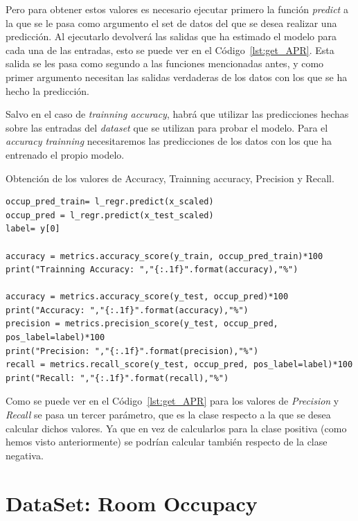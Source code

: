 \documentclass[a4paper, 12pt]{book}
\begin{document}
Pero para obtener estos valores es necesario ejecutar primero la función \textit{predict} a la que se le pasa como argumento el set de datos del que se desea realizar una predicción. Al ejecutarlo devolverá las salidas que ha estimado el modelo para cada una de las entradas, esto se puede ver en el Código~\ref{lst:get_APR}. Esta salida se les pasa como segundo a las funciones mencionadas antes, y como primer argumento necesitan las salidas verdaderas de los datos con los que se ha hecho la predicción. 

Salvo en el caso de \textit{trainning accuracy}, habrá que utilizar las predicciones hechas sobre las entradas del \textit{dataset} que se utilizan para probar el modelo. Para el \textit{accuracy trainning} necesitaremos las predicciones de los datos con los que ha entrenado el propio modelo.

\begin{listing}[]
    \caption{Obtención de los valores de Accuracy, Trainning accuracy, Precision y Recall.}{}
    \label{lst:get_APR}
    \begin{verbatim}
occup_pred_train= l_regr.predict(x_scaled)
occup_pred = l_regr.predict(x_test_scaled)    
label= y[0]

accuracy = metrics.accuracy_score(y_train, occup_pred_train)*100
print("Trainning Accuracy: ","{:.1f}".format(accuracy),"%")

accuracy = metrics.accuracy_score(y_test, occup_pred)*100
print("Accuracy: ","{:.1f}".format(accuracy),"%")
precision = metrics.precision_score(y_test, occup_pred, pos_label=label)*100
print("Precision: ","{:.1f}".format(precision),"%")
recall = metrics.recall_score(y_test, occup_pred, pos_label=label)*100
print("Recall: ","{:.1f}".format(recall),"%")
    \end{verbatim}
\end{listing}

Como se puede ver en el Código~\ref{lst:get_APR} para los valores de \textit{Precision} y \textit{Recall} se pasa un tercer parámetro, que es la clase respecto a la que se desea calcular dichos valores. Ya que en vez de calcularlos para la clase positiva (como hemos visto anteriormente) se podrían calcular también respecto de la clase negativa.

\section{DataSet: Room Occupacy}
\label{sec:dataSet_Occupancy}
\end{document}
